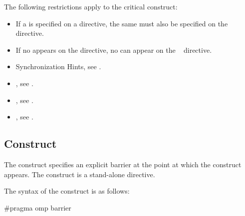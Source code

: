 \begin{fortranspecific}
The following restrictions apply to the critical construct:

\begin{itemize}
\item If a  is specified on a  directive, the same  must also be
specified on the ~ directive.

\item If no  appears on the  directive, no  can appear on the
~ directive.
\end{itemize}
\end{fortranspecific}

\crossreferences
\begin{itemize}
\item Synchronization Hints, see
.

\item {}, see
.

\item {}, see
.

\item {}, see
.

\end{itemize}









\subsection{ Construct}
\label{subsec:barrier Construct}
\summary
The  construct specifies an explicit barrier at the point at which the construct
appears. The  construct is a stand-alone directive.

\syntax
\begin{ccppspecific}
The syntax of the  construct is as follows:

\begin{ompcPragma}
#pragma omp barrier 
\end{ompcPragma}
\end{ccppspecific}

